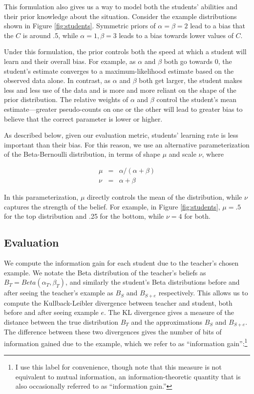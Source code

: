 \documentclass[10pt,letterpaper]{article}
\begin{document}
This formulation also gives us a way to model both the students' abilities and their prior knowledge about the situation. Consider the example distributions shown in Figure \ref{fig:students}. Symmetric priors of $\alpha=\beta=2$ lead to a bias that the $C$ is around .5, while $\alpha=1, \beta=3$ leads to a bias towards lower values of $C$. 

Under this formulation, the prior controls both the speed at which a student will learn and their overall bias. For example, as $\alpha$ and $\beta$ both go towards 0, the student's estimate converges to a maximum-likelihood estimate based on the observed data alone. In contrast, as $\alpha$ and $\beta$ both get larger, the student makes less and less use of the data and is more and more reliant on the shape of the prior distribution. The relative weights of $\alpha$ and $\beta$ control the student's mean estimate---greater pseudo-counts on one or the other will lead to greater bias to believe that the correct parameter is lower or higher. 

As described below, given our evaluation metric, students' learning rate is less important than their bias. For this reason, we use an alternative parameterization of the Beta-Bernoulli distribution, in terms of shape $\mu$ and scale $\nu$, where

\begin{eqnarray}
\mu &=&  \alpha / (\alpha + \beta) \\
\nu &=& \alpha + \beta
\end{eqnarray}

\noindent In this parameterization, $\mu$ directly controls the mean of the distribution, while $\nu$ captures the strength of the belief. For example, in Figure \ref{fig:students}, $\mu=.5$ for the top distribution and .25 for the bottom, while $\nu=4$ for both.

\subsection{Evaluation}

We compute the information gain for each student due to the teacher's chosen example. We notate the Beta distribution of the teacher's beliefs as $B_T = Beta(\alpha_T,\beta_T)$, and similarly the student's Beta distributions before and after seeing the teacher's example as $B_{S}$ and $B_{S+e}$ respectively. This allows us to compute the Kullback-Leibler divergence \cite{cover2012} between teacher and student, both before and after seeing example $e$. The KL divergence gives a measure of the distance between the true distribution $B_T$ and the approximations $B_{S}$ and $B_{S+e}$.
The difference between these two divergences gives the number of bits of information gained due to the example, which we refer to as ``information gain'':\footnote{I use this label for convenience, though note that this measure is not equivalent to mutual information, an information-theoretic quantity that is also occasionally referred to as ``information gain.''}
\end{document}

